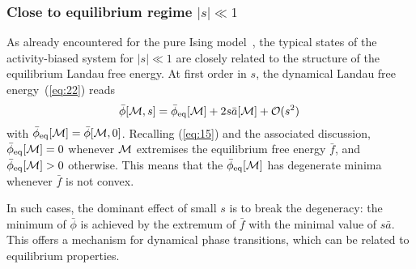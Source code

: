 \documentclass{iopart}
\newcommand{\eqref}[1]{(\ref{#1})}
\begin{document}


\subsubsection{Close to equilibrium regime $|s|\ll 1$}\label{sec:close_to_eq_reg}

As already encountered for the pure Ising model~\cite{GuiothJack2020}, the typical states of the activity-biased system for $|s|\ll1$ are closely related to the structure of the equilibrium Landau free energy.  %
%
At first order in $s$, the dynamical Landau free energy~\eqref{eq:22} reads
\begin{equation}
  \label{eq:18}
  \bar{\phi}[{\cal M}, s] = \bar{\phi}_{\rm eq}[{\cal M}] + 2s\bar{a}[{\cal M}] + \mathcal{O}(s^{2}) \,
\end{equation}
with $\bar{\phi}_{\rm eq}[{\cal M}] = \bar{\phi}[{\cal M}, 0]$.
Recalling (\ref{eq:15}) and the associated discussion, $\bar{\phi}_{\rm eq}[{\cal M}]=0$ whenever ${\cal M}$ extremises the equilibrium free energy $\bar f$,  and $\bar{\phi}_{\rm eq}[{\cal M}] >0$ otherwise.  
This means that the $\bar\phi_{\rm eq}[{\cal M}]$ has degenerate minima whenever $\bar f$ is not convex.

In such cases, the dominant effect of small $s$ is to break the degeneracy: the minimum of $\bar\phi$ is achieved by the extremum of $\bar f$ with the minimal value of $s\bar a$.
This offers a mechanism for dynamical phase transitions, which can be related to equilibrium properties.  
\end{document}
